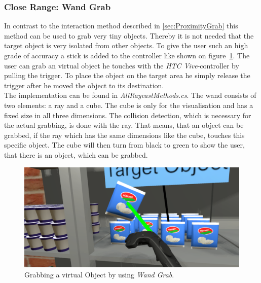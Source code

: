 \subsubsection{Close Range: Wand Grab} \label{sec:WandGrab}
In contrast to the interaction method described in \ref{sec:ProximityGrab} this method can be used to grab very tiny objects. Thereby it is not needed that the target object is very isolated from other objects. To give the user such an high grade of accuracy a stick is added to the controller like shown on figure~\ref{fig:wandGrab}. The user can grab an virtual object he touches with the \textit{HTC Vive}-controller by pulling the trigger. To place the object on the target area he simply release the trigger after he moved the object to its destination. \\
The implementation can be found in \textit{AllRaycastMethods.cs}. The wand consists of two elements: a ray \cite{website:Ray} and a cube. The cube is only for the visualisation and has a fixed size in all three dimensions. The collision detection, which is necessary for the actual grabbing, is done with the ray. That means, that an object can be grabbed, if the ray which has the same dimensions like the cube, touches this specific object. The cube will then turn from black to green to show the user, that there is an object, which can be grabbed.

\begin{figure}[H] 
	\center 
	\includegraphics[width=12cm]{Images/WandGrab.PNG}			
	\caption[Grabbing a virtual Object by using \textit{Wand Grab}.]{Grabbing a virtual Object by using \textit{Wand Grab}.}
	\label{fig:wandGrab}
\end{figure}

